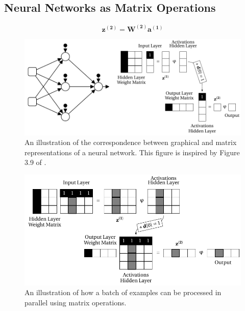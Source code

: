 \documentclass[xcolor={table}]{beamer}
\begin{document}
\subsection{Neural Networks as Matrix Operations}


 \begin{frame} 
\begin{equation}
\mathbf{z^{(2)}=W^{(2)}a^{(1)}}
\end{equation}
\end{frame} 



 \begin{frame} 
\begin{figure}[t]
\centerline{
\includegraphics[width=\textwidth]{./images/fmlpda_8_05.pdf}
}
\caption[An illustration of the correspondence between graphical and matrix representations of a neural network.]{An illustration of the correspondence between graphical and matrix representations of a neural network. This figure is inspired by Figure 3.9 of \citep{kelleher:2019}.}
\label{fig:networkasmatrix}
\end{figure}
\end{frame} 



 \begin{frame} 
\begin{figure}[t]
\centerline{
\includegraphics[width=\textwidth]{./images/fmlpda_8_06.pdf}
}
\caption[An illustration of how a batch of examples can be processed in parallel using matrix operations.]{An illustration of how a batch of examples can be processed in parallel using matrix operations.}
\label{fig:batchmatrixprocessing}
\end{figure}
\end{frame} 
\end{document}
